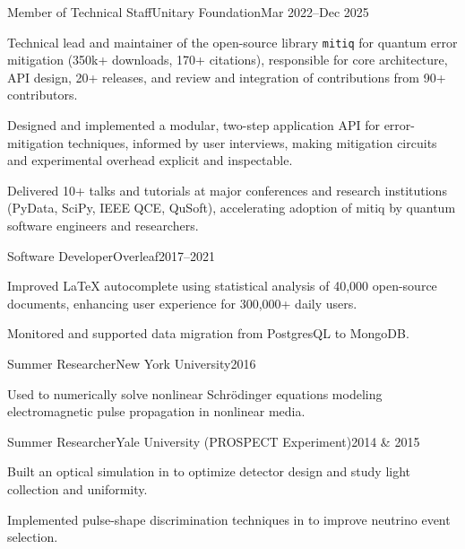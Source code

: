 \documentclass{cultvoucher}
\begin{document}
\begin{entry}{Member of Technical Staff}{Unitary Foundation}{Mar 2022--Dec 2025}
	\item Technical lead and maintainer of the open-source  library \texttt{mitiq} for quantum error mitigation (350k+ downloads, 170+ citations), responsible for core architecture, API design, 20+ releases, and review and integration of contributions from 90+ contributors.
	\item Designed and implemented a modular, two-step application API for error-mitigation techniques, informed by user interviews, making mitigation circuits and experimental overhead explicit and inspectable.
	\item Delivered 10+ talks and tutorials at major conferences and research institutions (PyData, SciPy, IEEE QCE, QuSoft), accelerating adoption of mitiq by quantum software engineers and researchers.
\end{entry}

\begin{entry}{Software Developer}{Overleaf}{2017--2021}
    \item Improved \LaTeX{} autocomplete using statistical analysis of 40,000 open-source documents, enhancing user experience for 300,000+ daily users.
    \item Monitored and supported data migration from PostgresQL to MongoDB.
\end{entry}

\begin{entry}{Summer Researcher}{New York University}{2016}
	\item Used  to numerically solve nonlinear Schr\"{o}dinger equations modeling electromagnetic pulse propagation in nonlinear media.
\end{entry}

\begin{entry}{Summer Researcher}{Yale University (PROSPECT Experiment)}{2014 \& 2015}
    \item Built an optical simulation in  to optimize detector design and study light collection and uniformity.
    \item Implemented pulse-shape discrimination techniques in  to improve neutrino event selection.
\end{entry}
\end{document}
